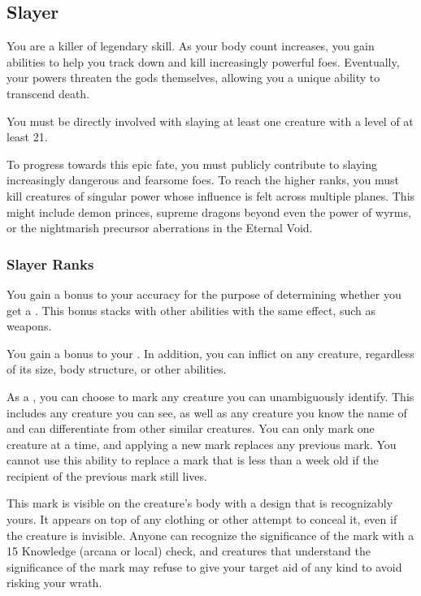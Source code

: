  \subsection{Slayer}
    You are a killer of legendary skill.
    As your body count increases, you gain abilities to help you track down and kill increasingly powerful foes.
    Eventually, your powers threaten the gods themselves, allowing you a unique ability to transcend death.

     You must be directly involved with slaying at least one  creature with a level of at least 21.

     To progress towards this epic fate, you must publicly contribute to slaying increasingly dangerous and fearsome foes.
    To reach the higher ranks, you must kill creatures of singular power whose influence is felt across multiple planes.
    This might include demon princes, supreme dragons beyond even the power of wyrms, or the nightmarish precursor aberrations in the Eternal Void.

    \subsubsection{Slayer Ranks}
       You gain a  bonus to your accuracy for the purpose of determining whether you get a .
      This bonus stacks with other abilities with the same effect, such as  weapons.

       You gain a  bonus to your .
      In addition, you can inflict  on any creature, regardless of its size, body structure, or other abilities.

       As a , you can choose to mark any creature you can unambiguously identify.
      This includes any creature you can see, as well as any creature you know the name of and can differentiate from other similar creatures.
      You can only mark one creature at a time, and applying a new mark replaces any previous mark.
      You cannot use this ability to replace a mark that is less than a week old if the recipient of the previous mark still lives.

      This mark is visible on the creature's body with a design that is recognizably yours.
      It appears on top of any clothing or other attempt to conceal it, even if the creature is invisible.
      Anyone can recognize the significance of the mark with a  15 Knowledge (arcana or local) check, and creatures that understand the significance of the mark may refuse to give your target aid of any kind to avoid risking your wrath.

